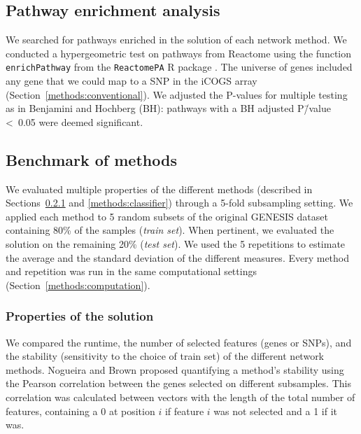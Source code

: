 \documentclass[10pt,letterpaper]{article}
\begin{document}
\subsection{Pathway enrichment analysis}
\label{methods:pathway_enrichment}

We searched for pathways enriched in the solution of each network method. We conducted a hypergeometric test on pathways from Reactome \cite{Jassal2019} using the function \texttt{enrichPathway} from the \texttt{ReactomePA} R package \cite{Yu2016}. The universe of genes included any gene that we could map to a SNP in the iCOGS array (Section~\ref{methods:conventional}). We adjusted the P-values for multiple testing as in Benjamini and Hochberg \cite{Benjamini1995} (BH): pathways with a BH adjusted P\=/value \textless~0.05 were deemed significant.

\subsection{Benchmark of methods}
\label{methods:benchmark}

We evaluated multiple properties of the different methods (described in Sections~\ref{methods:algorithm_comparison} and \ref{methods:classifier}) through a 5-fold subsampling setting. We applied each method to 5 random subsets of the original GENESIS dataset containing 80\% of the samples (\emph{train set}). When pertinent, we evaluated the solution on the remaining 20\% (\emph{test set}). We used the 5 repetitions to estimate the average and the standard deviation of the different measures. Every method and repetition was run in the same computational settings (Section~\ref{methods:computation}).

\subsubsection{Properties of the solution}
\label{methods:algorithm_comparison}

We compared the runtime, the number of selected features (genes or SNPs), and the stability (sensitivity to the choice of train set) of the different network methods. Nogueira and Brown \cite{nogueira_measuring_2016} proposed quantifying a method's stability using the Pearson correlation between the genes selected on different subsamples. This correlation was calculated between vectors with the length of the total number of features, containing a 0 at position $i$ if feature $i$ was not selected and a 1 if it was.
\end{document}
